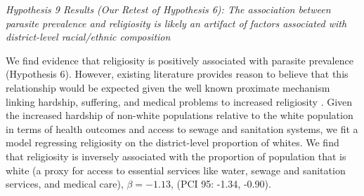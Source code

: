 \documentclass[12pt]{article}
\begin{document}
\noindent\textit{Hypothesis 9 Results (Our Retest of Hypothesis 6): The association between parasite prevalence and religiosity is likely an artifact of factors associated with district-level racial/ethnic composition}

	We find evidence that religiosity is positively associated with parasite prevalence (Hypothesis 6). However, existing literature provides reason to believe that this relationship would be expected given the well known proximate mechanism linking hardship, suffering, and medical problems to increased religiosity \citep{koenig2001religion}. Given the increased hardship of non-white populations relative to the white population in terms of health outcomes and access to sewage and sanitation systems, we fit a model regressing religiosity on the district-level proportion of whites.  We find that religiosity is inversely associated with the proportion of population that is white (a proxy for access to essential services like water, sewage and sanitation services, and medical care), $\beta=-1.13$, (PCI 95:  -1.34, -0.90).\\  
	
\end{document}
